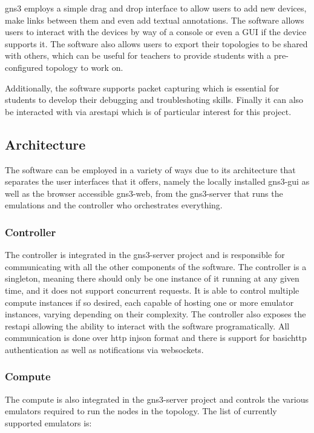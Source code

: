 \ac{gns3} employs a simple drag and drop interface to allow users to add new devices, make links between them 
and even add textual annotations. The software allows users to interact with the devices by way of a console or even a GUI
if the device supports it. The software also allows users to export their topologies to be shared with others, which can
be useful for teachers to provide students with a pre-configured topology to work on.

Additionally, the software supports packet capturing which is essential for students to develop their debugging and 
troubleshoting skills. Finally it can also be interacted with via a\ac{rest}\ac{api} which is of particular interest
for this project.

\subsection{Architecture}
The software can be employed in a variety of ways due to its architecture \cite{GNS3Architecture} that separates the user 
interfaces that it offers, namely the locally installed gns3-gui as well as the browser accessible gns3-web, from the 
gns3-server that runs the emulations and the controller who orchestrates everything. 

\subsubsection{Controller}
The controller is integrated in the gns3-server project and is responsible for communicating with all the other components 
of the software. The controller is a singleton, meaning there should only be one instance of it running at any given time, 
and it does not support concurrent requests. It is able to control multiple compute instances if so desired, each capable 
of hosting one or more emulator instances, varying depending on their complexity. The controller also exposes the 
\ac{rest}\ac{api} allowing the ability to interact with the software programatically. All communication is done over
\ac{http} in\ac{json} format and there is support for basic\ac{http} authentication as well as notifications via websockets.

\subsubsection{Compute}
The compute is also integrated in the gns3-server project and controls the various emulators required to run the nodes 
in the topology.
The list of currently supported emulators is:

